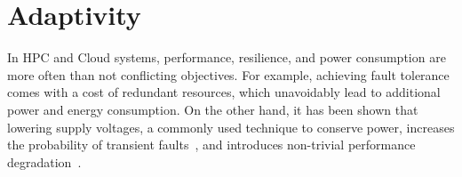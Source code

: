 


\section{Adaptivity}
\label{sec:shadowing_adaptivity}
In HPC and Cloud systems, performance, resilience, and power consumption are more often than not conflicting objectives. For example, achieving fault tolerance comes with a cost of redundant resources, which unavoidably lead to additional power and energy consumption. 
On the other hand, it has been shown that lowering supply voltages, a commonly used technique to conserve power, increases the probability of transient faults~\cite{chandra2008defect,zhao2008reliability}, and introduces non-trivial performance degradation~\cite{wang2013impact}.

